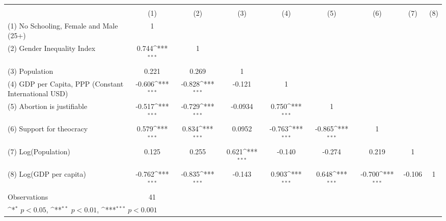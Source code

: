 {
\def\sym#1{\ifmmode^{#1}\else\(^{#1}\)\fi}
\begin{tabular}{l*{8}{c}}
\hline\hline
                &\multicolumn{8}{c}{}                                                                                                                                   \\
                &(1)&(2)&(3)&(4)&(5)&(6)&(7)&(8) \\
\hline
(1) No Schooling, Female and Male (25+)&        1         &                  &                  &                  &                  &                  &                  &                  \\
(2) Gender Inequality Index&    0.744\sym{***}&        1         &                  &                  &                  &                  &                  &                  \\
(3) Population      &    0.221         &    0.269         &        1         &                  &                  &                  &                  &                  \\
(4) GDP per Capita, PPP (Constant International USD)&   -0.606\sym{***}&   -0.828\sym{***}&   -0.121         &        1         &                  &                  &                  &                  \\
(5) Abortion is justifiable&   -0.517\sym{***}&   -0.729\sym{***}&  -0.0934         &    0.750\sym{***}&        1         &                  &                  &                  \\
(6) Support for theocracy&    0.579\sym{***}&    0.834\sym{***}&   0.0952         &   -0.763\sym{***}&   -0.865\sym{***}&        1         &                  &                  \\
(7) Log(Population) &    0.125         &    0.255         &    0.621\sym{***}&   -0.140         &   -0.274         &    0.219         &        1         &                  \\
(8) Log(GDP per capita)&   -0.762\sym{***}&   -0.835\sym{***}&   -0.143         &    0.903\sym{***}&    0.648\sym{***}&   -0.700\sym{***}&   -0.106         &        1         \\
\hline
Observations    &       41         &                  &                  &                  &                  &                  &                  &                  \\
\hline\hline
\multicolumn{9}{l}{\footnotesize \sym{*} \(p<0.05\), \sym{**} \(p<0.01\), \sym{***} \(p<0.001\)}\\
\end{tabular}
}
